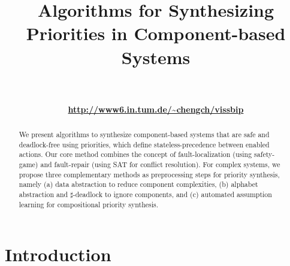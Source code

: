 \documentclass[10pt, a4paper, onecolumn, conference, compsocconf]{IEEEtran}
\begin{document}
\title{Algorithms for Synthesizing Priorities in Component-based Systems}



\author{
                    \\
\\

\textbf{\url{http://www6.in.tum.de/~chengch/vissbip}}
}





\maketitle

\begin{abstract}
We present algorithms to synthesize component-based systems
that are safe and deadlock-free using priorities, which define stateless-precedence
between enabled actions. Our core method combines the concept of fault-localization (using safety-game) and fault-repair (using SAT for conflict resolution). For complex systems, we propose three complementary methods as preprocessing steps for priority synthesis, namely (a) data abstraction to reduce component complexities, (b) alphabet abstraction and $\sharp$-deadlock to ignore components, and (c) automated assumption learning for compositional priority synthesis.

\end{abstract}




\IEEEpeerreviewmaketitle

\section{Introduction\label{sec.algo.prioritysyn.introduction}}
\end{document}
